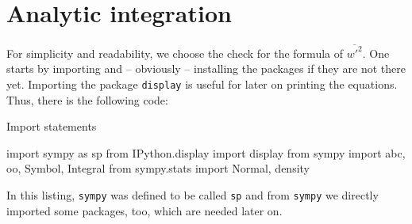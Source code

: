 \section{Analytic integration}\label{sec:anaintsympy}

For simplicity and readability, we choose the check for the formula of $\overline{w'^2}$.
One starts by importing and -- obviously -- installing the packages if they are not there yet.
Importing the package \texttt{display} is useful for later on printing the equations.
Thus, there is the following code:
\begin{listing}[!ht]
    \caption{Import statements}
    \label{lst:import}
    \begin{pythoncode}
        import sympy as sp
        from IPython.display import display
        from sympy import abc, oo, Symbol, Integral
        from sympy.stats import Normal, density
    \end{pythoncode}
\end{listing}
In this listing, \texttt{sympy} was defined to be called \texttt{sp} and from \texttt{sympy} we directly imported some packages, too, which are needed later on.

